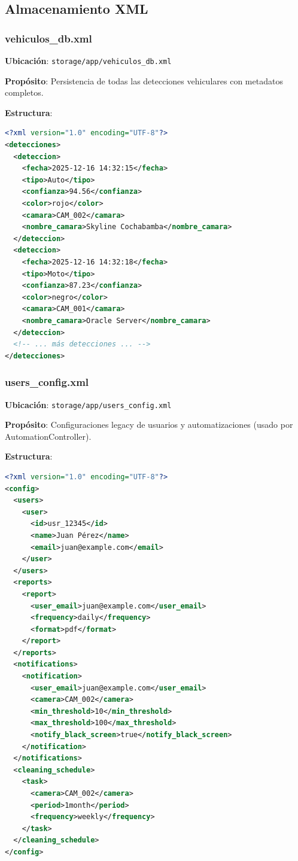 \documentclass[12pt,a4paper]{article}
\begin{document}
\subsection{Almacenamiento XML}

\subsubsection{vehiculos\_db.xml}

\textbf{Ubicación}: \texttt{storage/app/vehiculos\_db.xml}

\textbf{Propósito}: Persistencia de todas las detecciones vehiculares con metadatos completos.

\textbf{Estructura}:

\begin{lstlisting}[caption={Estructura XML de Detecciones}, language=XML, label=lst:xml-structure]
<?xml version="1.0" encoding="UTF-8"?>
<detecciones>
  <deteccion>
    <fecha>2025-12-16 14:32:15</fecha>
    <tipo>Auto</tipo>
    <confianza>94.56</confianza>
    <color>rojo</color>
    <camara>CAM_002</camara>
    <nombre_camara>Skyline Cochabamba</nombre_camara>
  </deteccion>
  <deteccion>
    <fecha>2025-12-16 14:32:18</fecha>
    <tipo>Moto</tipo>
    <confianza>87.23</confianza>
    <color>negro</color>
    <camara>CAM_001</camara>
    <nombre_camara>Oracle Server</nombre_camara>
  </deteccion>
  <!-- ... más detecciones ... -->
</detecciones>
\end{lstlisting}

\subsubsection{users\_config.xml}

\textbf{Ubicación}: \texttt{storage/app/users\_config.xml}

\textbf{Propósito}: Configuraciones legacy de usuarios y automatizaciones (usado por AutomationController).

\textbf{Estructura}:

\begin{lstlisting}[caption={Estructura XML de Configuración}, language=XML, label=lst:xml-config]
<?xml version="1.0" encoding="UTF-8"?>
<config>
  <users>
    <user>
      <id>usr_12345</id>
      <name>Juan Pérez</name>
      <email>juan@example.com</email>
    </user>
  </users>
  <reports>
    <report>
      <user_email>juan@example.com</user_email>
      <frequency>daily</frequency>
      <format>pdf</format>
    </report>
  </reports>
  <notifications>
    <notification>
      <user_email>juan@example.com</user_email>
      <camera>CAM_002</camera>
      <min_threshold>10</min_threshold>
      <max_threshold>100</max_threshold>
      <notify_black_screen>true</notify_black_screen>
    </notification>
  </notifications>
  <cleaning_schedule>
    <task>
      <camera>CAM_002</camera>
      <period>1month</period>
      <frequency>weekly</frequency>
    </task>
  </cleaning_schedule>
</config>
\end{lstlisting}
\end{document}

